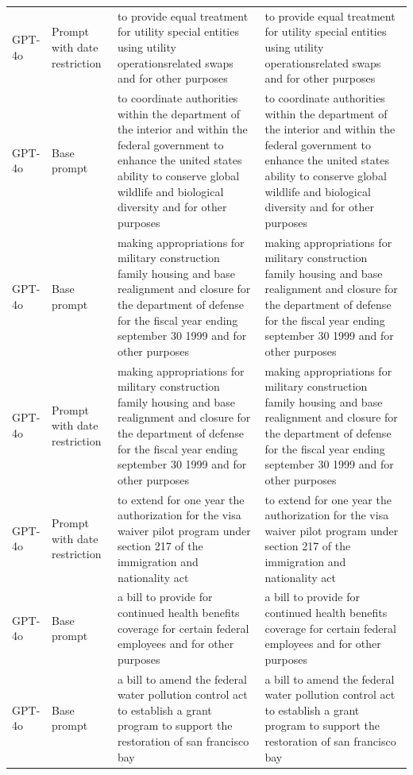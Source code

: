 \begin{longtable}{>{\raggedright\arraybackslash}p{1.4cm}>{\raggedright\arraybackslash}p{1.4cm}>{\raggedright\arraybackslash}p{5.5cm}>{\raggedright\arraybackslash}p{5.5cm}}
GPT-4o & Prompt with date restriction & to provide equal treatment for utility special entities using utility operationsrelated swaps and for other purposes & to provide equal treatment for utility special entities using utility operationsrelated swaps and for other purposes\\
GPT-4o & Base prompt & to coordinate authorities within the department of the interior and within the federal government to enhance the united states ability to conserve global wildlife and biological diversity and for other purposes & to coordinate authorities within the department of the interior and within the federal government to enhance the united states ability to conserve global wildlife and biological diversity and for other purposes\\
GPT-4o & Base prompt & making appropriations for military construction family housing and base realignment and closure for the department of defense for the fiscal year ending september 30 1999 and for other purposes & making appropriations for military construction family housing and base realignment and closure for the department of defense for the fiscal year ending september 30 1999 and for other purposes\\
GPT-4o & Prompt with date restriction & making appropriations for military construction family housing and base realignment and closure for the department of defense for the fiscal year ending september 30 1999 and for other purposes & making appropriations for military construction family housing and base realignment and closure for the department of defense for the fiscal year ending september 30 1999 and for other purposes\\
GPT-4o & Prompt with date restriction & to extend for one year the authorization for the visa waiver pilot program under section 217 of the immigration and nationality act & to extend for one year the authorization for the visa waiver pilot program under section 217 of the immigration and nationality act\\
GPT-4o & Base prompt & a bill to provide for continued health benefits coverage for certain federal employees and for other purposes & a bill to provide for continued health benefits coverage for certain federal employees and for other purposes\\
GPT-4o & Base prompt & a bill to amend the federal water pollution control act to establish a grant program to support the restoration of san francisco bay & a bill to amend the federal water pollution control act to establish a grant program to support the restoration of san francisco bay\\

\end{longtable}
